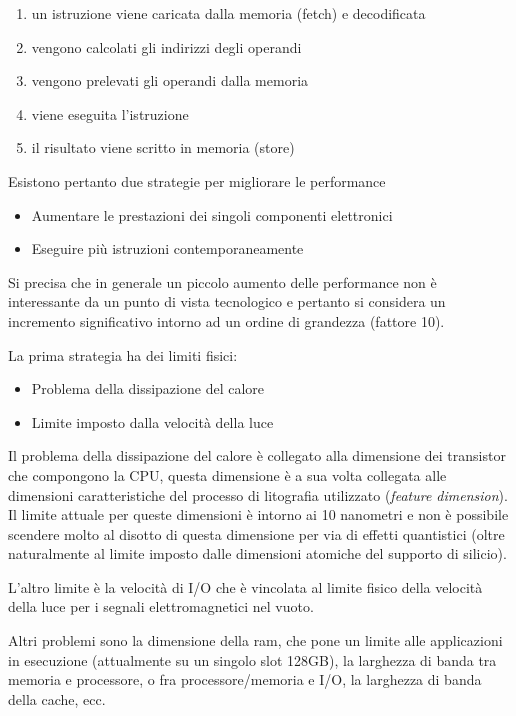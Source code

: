 \documentclass[italian,]{article}
\providecommand{\tightlist}{%
  \setlength{\itemsep}{0pt}\setlength{\parskip}{0pt}}
\begin{document}
\begin{enumerate}
\def\labelenumi{\arabic{enumi}.}
\tightlist
\item
  un istruzione viene caricata dalla memoria (fetch) e decodificata
\item
  vengono calcolati gli indirizzi degli operandi
\item
  vengono prelevati gli operandi dalla memoria
\item
  viene eseguita l'istruzione
\item
  il risultato viene scritto in memoria (store)
\end{enumerate}

Esistono pertanto due strategie per migliorare le performance

\begin{itemize}
\tightlist
\item
  Aumentare le prestazioni dei singoli componenti elettronici
\item
  Eseguire più istruzioni contemporaneamente
\end{itemize}

Si precisa che in generale un piccolo aumento delle performance non è
interessante da un punto di vista tecnologico e pertanto si considera un
incremento significativo intorno ad un ordine di grandezza (fattore 10).

La prima strategia ha dei limiti fisici:

\begin{itemize}
\tightlist
\item
  Problema della dissipazione del calore
\item
  Limite imposto dalla velocità della luce
\end{itemize}

Il problema della dissipazione del calore è collegato alla dimensione
dei transistor che compongono la CPU, questa dimensione è a sua volta
collegata alle dimensioni caratteristiche del processo di litografia
utilizzato (\emph{feature dimension}). Il limite attuale per queste
dimensioni è intorno ai 10 nanometri e non è possibile scendere molto al
disotto di questa dimensione per via di effetti quantistici (oltre
naturalmente al limite imposto dalle dimensioni atomiche del supporto di
silicio).

L'altro limite è la velocità di I/O che è vincolata al limite fisico
della velocità della luce per i segnali elettromagnetici nel vuoto.

Altri problemi sono la dimensione della ram, che pone un limite alle
applicazioni in esecuzione (attualmente su un singolo slot 128GB), la
larghezza di banda tra memoria e processore, o fra processore/memoria e
I/O, la larghezza di banda della cache, ecc.
\end{document}

